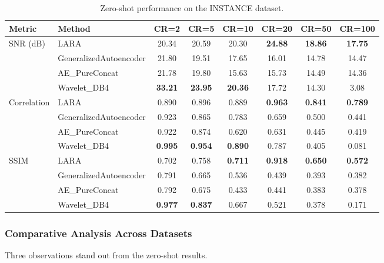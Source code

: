 \documentclass[fleqn,10pt]{wlscirep}
\begin{document}
\begin{table}[!t]
\centering
\caption{Zero-shot performance on the INSTANCE dataset.}
\label{tab:zero-shot-instance}
\begin{tabular}{l l c c c c c c}
\toprule
\textbf{Metric} & \textbf{Method} & \textbf{CR=2} & \textbf{CR=5} & \textbf{CR=10} & \textbf{CR=20} & \textbf{CR=50} & \textbf{CR=100} \\
\midrule
SNR (dB) & {LARA} & {20.34} & {20.59} & {20.30} & \textbf{24.88} & \textbf{18.86} & \textbf{17.75} \\
 & GeneralizedAutoencoder & 21.80 & 19.51 & 17.65 & 16.01 & 14.78 & 14.47 \\
 & AE\_PureConcat & 21.78 & 19.80 & 15.63 & 15.73 & 14.49 & 14.36 \\
 & Wavelet\_DB4 & \textbf{33.21} & \textbf{23.95} & \textbf{20.36} & 17.72 & 14.30 & 3.08 \\
\midrule
Correlation & {LARA} & {0.890} & {0.896} &  {0.889} & \textbf{0.963} & \textbf{0.841} & \textbf{0.789} \\
 & GeneralizedAutoencoder & 0.923 & 0.865 & 0.783 & 0.659 & 0.500 & 0.441 \\
 & AE\_PureConcat & 0.922 & 0.874 & 0.620 & 0.631 & 0.445 & 0.419 \\
 & Wavelet\_DB4 &\textbf {0.995} & \textbf {0.954} & \textbf {0.890} & 0.787 & 0.405 & 0.081 \\ 
\midrule
SSIM & {LARA} & {0.702} & {0.758} & \textbf{0.711} & \textbf{0.918} & \textbf{0.650} & \textbf{0.572} \\
 & GeneralizedAutoencoder & 0.791 & 0.665 & 0.536 & 0.439 & 0.393 & 0.382 \\
 & AE\_PureConcat & 0.792 & 0.675 & 0.433 & 0.441 & 0.383 & 0.378 \\
 & Wavelet\_DB4 & \textbf {0.977} & \textbf {0.837} &  {0.667} & 0.521 & 0.378 & 0.171 \\
\bottomrule
\end{tabular}
\end{table}

\subsubsection{Comparative Analysis Across Datasets}

Three observations stand out from the zero-shot results.
\end{document}
